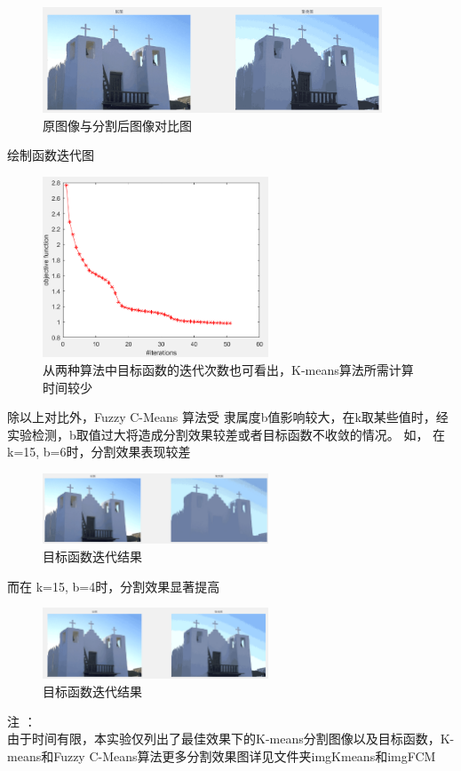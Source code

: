 \documentclass{article}
\begin{document}
\begin{itemize}
    \begin{figure}[H]
        \centering
        \includegraphics[width=0.9\textwidth]{img/K15B4.png} 
        \caption{原图像与分割后图像对比图}
        \label{fig.7}
    \end{figure}
    
   绘制函数迭代图
\begin{figure}[H]
	\centering
	\includegraphics[width=0.6\textwidth]{img/funK15B4.png} 
	\caption{从两种算法中目标函数的迭代次数也可看出，K-means算法所需计算时间较少}
	\label{fig.8}
\end{figure}   
除以上对比外，Fuzzy C-Means 算法受 隶属度b值影响较大，在k取某些值时，经实验检测，b取值过大将造成分割效果较差或者目标函数不收敛的情况。
如， 在 k=15, b=6时，分割效果表现较差
\begin{figure}[H]
	\centering
	\includegraphics[width=0.6\textwidth]{img/K15B6.png} 
	\caption{目标函数迭代结果}
	\label{fig.2}
\end{figure}   
而在 k=15, b=4时，分割效果显著提高
\begin{figure}[H]
	\centering
	\includegraphics[width=0.6\textwidth]{img/K15B2.png} 
	\caption{目标函数迭代结果}
	\label{fig.8}
\end{figure}   
\end{itemize}
注 ：\\
由于时间有限，本实验仅列出了最佳效果下的K-means分割图像以及目标函数，K-means和Fuzzy C-Means算法更多分割效果图详见文件夹imgKmeans和imgFCM
\end{document}
